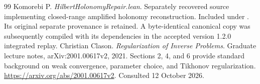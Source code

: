 \begin{thebibliography}{99}
 Komorebi P. \emph{HilbertHolonomyRepair.lean}. Separately recovered source implementing closed-range amplified holonomy reconstruction. Included under . Its original separate provenance is retained. A byte-identical canonical copy was subsequently compiled with its dependencies in the accepted version 1.2.0 integrated replay.
 Christian Clason. \emph{Regularization of Inverse Problems}. Graduate lecture notes, arXiv:2001.00617v2, 2021. Sections 2, 4, and 6 provide standard background on weak convergence, parameter choice, and Tikhonov regularization. \url{https://arxiv.org/abs/2001.00617v2}. Consulted 12 October 2026.
\end{thebibliography}


